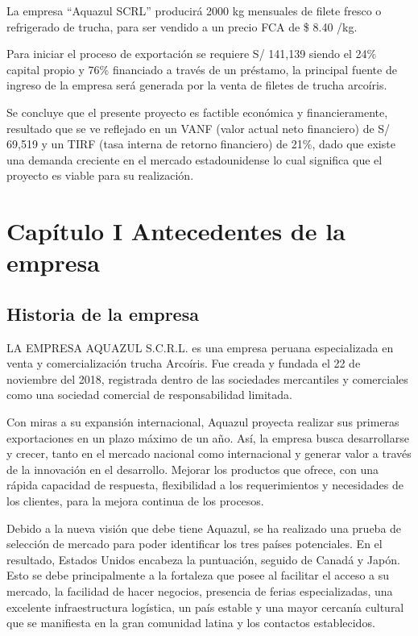 \documentclass[
  stu,
  floatsintext,
  longtable,
  a4paper,
  nolmodern,
  notxfonts,
  notimes,
  12pt,
  colorlinks=true,linkcolor=blue,citecolor=blue,urlcolor=blue]{apa7}
\begin{document}
La empresa ``Aquazul SCRL'' producirá 2000 kg mensuales de filete fresco
o refrigerado de trucha, para ser vendido a un precio FCA de \$ 8.40
/kg.

Para iniciar el proceso de exportación se requiere S/ 141,139 siendo el
24\% capital propio y 76\% financiado a través de un préstamo, la
principal fuente de ingreso de la empresa será generada por la venta de
filetes de trucha arcoíris.

Se concluye que el presente proyecto es factible económica y
financieramente, resultado que se ve reflejado en un VANF (valor actual
neto financiero) de S/ 69,519 y un TIRF (tasa interna de retorno
financiero) de 21\%, dado que existe una demanda creciente en el mercado
estadounidense lo cual significa que el proyecto es viable para su
realización.

\section{Capítulo I Antecedentes de la
empresa}\label{capuxedtulo-i-antecedentes-de-la-empresa}

\subsection{Historia de la empresa}\label{historia-de-la-empresa}

LA EMPRESA AQUAZUL S.C.R.L. es una empresa peruana especializada en
venta y comercialización trucha Arcoíris. Fue creada y fundada el 22 de
noviembre del 2018, registrada dentro de las sociedades mercantiles y
comerciales como una sociedad comercial de responsabilidad limitada.

Con miras a su expansión internacional, Aquazul proyecta realizar sus
primeras exportaciones en un plazo máximo de un año. Así, la empresa
busca desarrollarse y crecer, tanto en el mercado nacional como
internacional y generar valor a través de la innovación en el
desarrollo. Mejorar los productos que ofrece, con una rápida capacidad
de respuesta, flexibilidad a los requerimientos y necesidades de los
clientes, para la mejora continua de los procesos.

Debido a la nueva visión que debe tiene Aquazul, se ha realizado una
prueba de selección de mercado para poder identificar los tres países
potenciales. En el resultado, Estados Unidos encabeza la puntuación,
seguido de Canadá y Japón. Esto se debe principalmente a la fortaleza
que posee al facilitar el acceso a su mercado, la facilidad de hacer
negocios, presencia de ferias especializadas, una excelente
infraestructura logística, un país estable y una mayor cercanía cultural
que se manifiesta en la gran comunidad latina y los contactos
establecidos.
\end{document}
